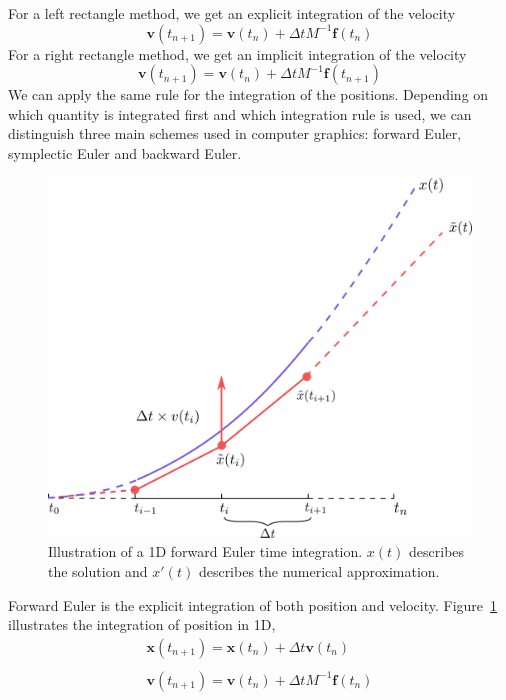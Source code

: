 For a left rectangle method, we get an explicit integration of the velocity
\begin{equation}
\label{eq:explicitIntegration}
\mathbf{v}(t_{n+1}) = \mathbf{v}(t_{n}) + \Delta t M^{-1}\mathbf{f}(t_{n})
\end{equation}
For a right rectangle method, we get an implicit integration of the velocity
\begin{equation}
\label{eq:implicitIntegration}
\mathbf{v}(t_{n+1}) = \mathbf{v}(t_{n}) + \Delta t M^{-1}\mathbf{f}(t_{n+1})
\end{equation}
We can apply the same rule for the integration of the positions.
Depending on which quantity is integrated first and which integration rule is used, we can distinguish three main schemes used in computer graphics: forward Euler, symplectic Euler and backward Euler.
\begin{figure}[!ht]
	\centering
	\includegraphics[scale=0.6]{images/continuum_mechanics/timeIntegration.png}
	\caption[STAR mechanics: Temporal integration]{\label{fig:timeIntegration} 
		Illustration of a 1D forward Euler time integration. 
		$x(t)$ describes the solution and $x'(t)$ describes the numerical approximation.}
\end{figure}
Forward Euler is the explicit integration of both position and velocity.
Figure~\ref{fig:timeIntegration} illustrates the integration of position in 1D,
\begin{equation}
\label{eq:explicitEuler}
\begin{array}{l}
\displaystyle \mathbf{x}(t_{n+1}) = \mathbf{x}(t_{n}) + \Delta t \mathbf{v}(t_{n}) \\ \\
\displaystyle \mathbf{v}(t_{n+1}) = \mathbf{v}(t_{n}) + \Delta t M^{-1}\mathbf{f}(t_{n})
\end{array}
\end{equation}
